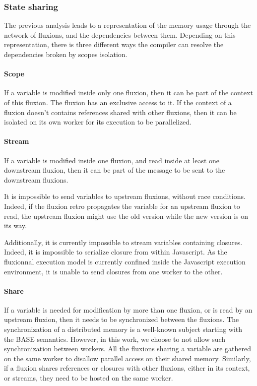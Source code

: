\subsubsection{State sharing}

The previous analysis leads to a representation of the memory usage through the network of fluxions, and the dependencies between them.
Depending on this representation, there is three different ways the compiler can resolve the dependencies broken by scopes isolation.

\paragraph{Scope}
If a variable is modified inside only one fluxion, then it can be part of the context of this fluxion.
The fluxion has an exclusive access to it.
If the context of a fluxion doesn't contains references shared with other fluxions, then it can be isolated on its own worker for its execution to be parallelized.

\paragraph{Stream}
If a variable is modified inside one fluxion, and read inside at least one downstream fluxion, then it can be part of the message to be sent to the downstream fluxions.

It is impossible to send variables to upstream flux\-ions, without race conditions.
Indeed, if the fluxion retro propagates the variable for an upstream fluxion to read, the upstream fluxion might use the old version while the new version is on its way.

Additionally, it is currently impossible to stream variables containing closures.
Indeed, it is impossible to serialize closure from within Javascript.
As the fluxionnal execution model is currently confined inside the Javascript execution environment, it is unable to send closures from one worker to the other.

\paragraph{Share}
If a variable is needed for modification by more than one fluxion, or is read by an upstream fluxion, then it needs to be synchronized between the fluxions.
The synchronization of a distributed memory is a well-known subject starting with %
the BASE semantics\cite{Fox1997}.
However, in this work, we choose to not allow such synchronization between workers.
All the fluxions sharing a variable are gathered on the same worker to disallow parallel access on their shared memory.
Similarly, if a fluxion shares references or closures with other fluxions, either in its context, or streams, they need to be hosted on the same worker.


















